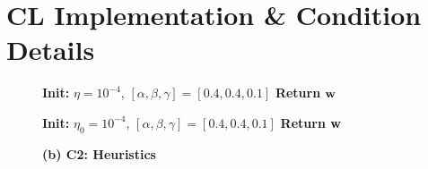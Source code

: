 \section{CL Implementation \& Condition Details}
\label{app:standard_cl}
\begin{figure}[!htb]
\centering
\begin{minipage}[t]{0.48\textwidth}
\begin{algorithm}[H]
\caption*{\textbf{(a) C1: Baseline}}
\label{alg:c1}
\textbf{Init:} $\eta = 10^{-4}$, $[\alpha,\beta,\gamma] = [0.4, 0.4, 0.1]$\;
{\bfseries Return} $\boldsymbol{\mathrm{w}}$\;
\end{algorithm}
\end{minipage}
\hfill
\begin{minipage}[t]{0.48\textwidth}
\begin{algorithm}[H]
\caption*{\textbf{(b) C2: Heuristics}}
\label{alg:c2}
\textbf{Init:} $\eta_0 = 10^{-4}$, $[\alpha,\beta,\gamma] = [0.4, 0.4, 0.1]$\;
{\bfseries Return} $\boldsymbol{\mathrm{w}}$\;
\end{algorithm}
\end{minipage}

\vspace{0.5em}


\end{figure}
